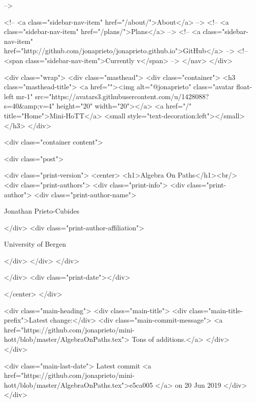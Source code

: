       
     -->

    <!-- <a class="sidebar-nav-item" href="/about/">About</a> -->
    <!-- <a class="sidebar-nav-item" href="/plans/">Plans</a> -->
    <!-- <a class="sidebar-nav-item" href="http://github.com/jonaprieto/jonaprieto.github.io">GitHub</a> -->
    <!-- <span class="sidebar-nav-item">Currently v</span> -->
  </nav>
</div>

    <div class="wrap">
      <div class="masthead">
        <div class="container">
          <h3 class="masthead-title">
            <a href=""><img alt="@jonaprieto" class="avatar float-left mr-1" src="https://avatars3.githubusercontent.com/u/1428088?s=40&amp;v=4" height="20" width="20"></a>
            <a href="/" title="Home">Mini-HoTT</a>
            <small style="text-decoration:left"></small>
          </h3>
        </div>
      
      <div class="container content">
        







<div class="post">

  <div class="print-version">
    <center>
      <h1>Algebra On Paths</h1><br/>
        <div class="print-authors">
          <div class="print-info">
            <div class="print-author">
              <div class="print-author-name">
                
                  Jonathan Prieto-Cubides
                
              </div>
              <div class="print-author-affiliation">
                
                  University of Bergen
                
                </div>
            </div>
          </div>
          
          
        </div>
        <div class="print-date"></div>
        
        
    </center>
  </div>

  
  <div class="main-heading">
    <div class="main-title">
      <div class="main-title-prefix">Latest change:</div>
      <div class="main-commit-message">
            <a href="https://github.com/jonaprieto/mini-hott/blob/master/AlgebraOnPaths.tex">
              Tons of additions.</a>
      </div>
    </div>

    <div class="main-last-date">
      Latest commit <a href="https://github.com/jonaprieto/mini-hott/blob/master/AlgebraOnPaths.tex">e5ca005 </a> on  20 Jun 2019
    </div>
  </div>
  
